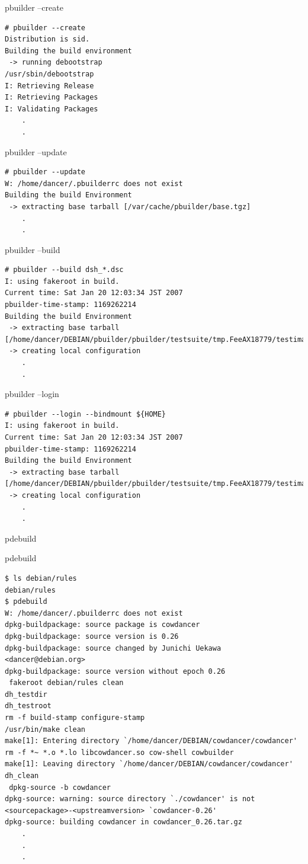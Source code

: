 \documentclass[dvipdfm,17pt,times]{beamer}
\newcommand{\emtext}[1]{
\begin{frame}{}
 
{\Huge #1
}
\end{frame}
}
\begin{document}
\begin{frame}[containsverbatim]{pbuilder --create}
\begin{verbatim}
# pbuilder --create
Distribution is sid.
Building the build environment
 -> running debootstrap
/usr/sbin/debootstrap
I: Retrieving Release
I: Retrieving Packages
I: Validating Packages
	.
	.
\end{verbatim}
\end{frame}

\begin{frame}[containsverbatim]{pbuilder --update}
\begin{verbatim}
# pbuilder --update
W: /home/dancer/.pbuilderrc does not exist
Building the build Environment
 -> extracting base tarball [/var/cache/pbuilder/base.tgz]
	.
	.
\end{verbatim}
\end{frame}

\begin{frame}[containsverbatim]{pbuilder --build}
\begin{verbatim}
# pbuilder --build dsh_*.dsc
I: using fakeroot in build.
Current time: Sat Jan 20 12:03:34 JST 2007
pbuilder-time-stamp: 1169262214
Building the build Environment
 -> extracting base tarball [/home/dancer/DEBIAN/pbuilder/pbuilder/testsuite/tmp.FeeAX18779/testimage]
 -> creating local configuration
	.
	.
\end{verbatim}
\end{frame}


\begin{frame}[containsverbatim]{pbuilder --login}
\begin{verbatim}
# pbuilder --login --bindmount ${HOME}
I: using fakeroot in build.
Current time: Sat Jan 20 12:03:34 JST 2007
pbuilder-time-stamp: 1169262214
Building the build Environment
 -> extracting base tarball [/home/dancer/DEBIAN/pbuilder/pbuilder/testsuite/tmp.FeeAX18779/testimage]
 -> creating local configuration
	.
	.
\end{verbatim}
\end{frame}

\emtext{pdebuild}

\begin{frame}[containsverbatim]{pdebuild}
\begin{verbatim}
$ ls debian/rules
debian/rules
$ pdebuild
W: /home/dancer/.pbuilderrc does not exist
dpkg-buildpackage: source package is cowdancer
dpkg-buildpackage: source version is 0.26
dpkg-buildpackage: source changed by Junichi Uekawa <dancer@debian.org>
dpkg-buildpackage: source version without epoch 0.26
 fakeroot debian/rules clean
dh_testdir
dh_testroot
rm -f build-stamp configure-stamp
/usr/bin/make clean
make[1]: Entering directory `/home/dancer/DEBIAN/cowdancer/cowdancer'
rm -f *~ *.o *.lo libcowdancer.so cow-shell cowbuilder
make[1]: Leaving directory `/home/dancer/DEBIAN/cowdancer/cowdancer'
dh_clean
 dpkg-source -b cowdancer
dpkg-source: warning: source directory `./cowdancer' is not <sourcepackage>-<upstreamversion> `cowdancer-0.26'
dpkg-source: building cowdancer in cowdancer_0.26.tar.gz
	.
	.
	.
\end{verbatim}
\end{frame}
\end{document}
